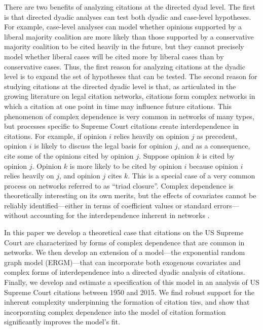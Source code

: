 \documentclass{cup-pan}
\begin{document}
There are two benefits of analyzing citations at the directed dyad level. The first is that directed dyadic analyses can test both dyadic and case-level hypotheses. For example, case-level analyses can model whether opinions supported by a liberal majority coalition are more likely than those supported by a conservative majority coalition to be cited heavily in the future, but they cannot precisely model whether liberal cases will be cited more by liberal cases than by conservative cases. Thus, the first reason for analyzing citations at the dyadic level is to expand the set of hypotheses that can be tested. The second reason for studying citations at the directed dyadic level is that, as articulated in the growing literature on legal citation networks, citations form complex networks in which a citation at one point in time may influence future citations. This phenomenon of complex dependence is very common in networks of many types, but processes specific to Supreme Court citations create interdependence in citations. For example, if opinion $i$ relies heavily on opinion $j$ as precedent, opinion $i$ is likely to discuss the legal basis for opinion $j$, and as a consequence, cite some of the opinions cited by opinion $j$. Suppose opinion $k$ is cited by opinion $j$. Opinion $k$ is more likely to be cited by opinion $i$ because opinion $i$ relies heavily on $j$, and opinion $j$ cites $k$.  This is a special case of a very common process on networks referred to as ``triad closure''. Complex dependence is theoretically interesting on its own merits, but the effects of covariates cannot be reliably identified---either in terms of coefficient values or standard errors---without accounting for the interdependence inherent in networks \citep{cranmer2016critique}. 

In this paper we develop a theoretical case that citations on the US Supreme Court are characterized by forms of complex dependence that are common in networks. We then develop an extension of a model---the exponential random graph model (ERGM)---that can incorporate both exogenous covariates and complex forms of interdependence into a directed dyadic analysis of citations. Finally, we develop and estimate a specification of this model in an analysis of US Supreme Court citations between 1950 and 2015. We find robust support for the inherent complexity underpinning the formation of citation ties, and show that incorporating complex dependence into the model of citation formation significantly improves the model's fit.
\end{document}
